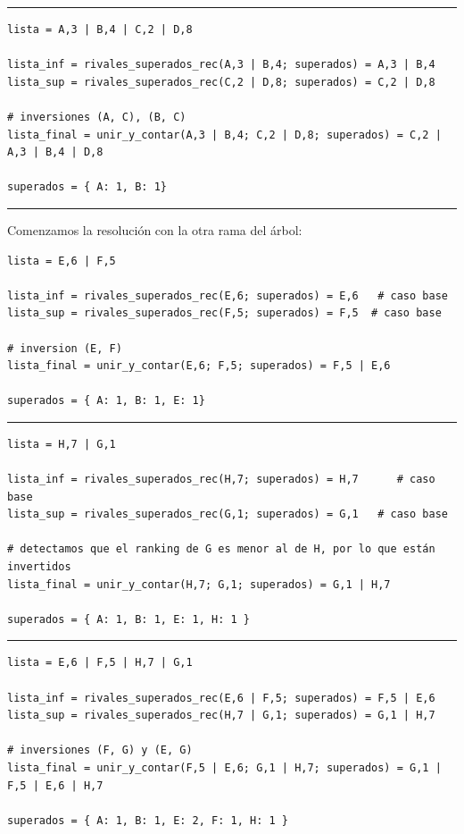 \documentclass[titlepage,a4paper]{article}
\begin{document}
\noindent\rule{\textwidth}{0.5pt}


\begin{verbatim}
lista = A,3 | B,4 | C,2 | D,8

lista_inf = rivales_superados_rec(A,3 | B,4; superados) = A,3 | B,4
lista_sup = rivales_superados_rec(C,2 | D,8; superados) = C,2 | D,8

# inversiones (A, C), (B, C)
lista_final = unir_y_contar(A,3 | B,4; C,2 | D,8; superados) = C,2 | A,3 | B,4 | D,8

superados = { A: 1, B: 1}
\end{verbatim}

\noindent\rule{\textwidth}{0.5pt}

Comenzamos la resolución con la otra rama del árbol:

\begin{verbatim}
lista = E,6 | F,5

lista_inf = rivales_superados_rec(E,6; superados) = E,6   # caso base
lista_sup = rivales_superados_rec(F,5; superados) = F,5  # caso base

# inversion (E, F)
lista_final = unir_y_contar(E,6; F,5; superados) = F,5 | E,6

superados = { A: 1, B: 1, E: 1}
\end{verbatim}

\noindent\rule{\textwidth}{0.5pt}
\begin{verbatim}
lista = H,7 | G,1

lista_inf = rivales_superados_rec(H,7; superados) = H,7      # caso base
lista_sup = rivales_superados_rec(G,1; superados) = G,1   # caso base

# detectamos que el ranking de G es menor al de H, por lo que están invertidos
lista_final = unir_y_contar(H,7; G,1; superados) = G,1 | H,7

superados = { A: 1, B: 1, E: 1, H: 1 }
\end{verbatim}

\noindent\rule{\textwidth}{0.5pt}

\begin{verbatim}
lista = E,6 | F,5 | H,7 | G,1

lista_inf = rivales_superados_rec(E,6 | F,5; superados) = F,5 | E,6
lista_sup = rivales_superados_rec(H,7 | G,1; superados) = G,1 | H,7

# inversiones (F, G) y (E, G)
lista_final = unir_y_contar(F,5 | E,6; G,1 | H,7; superados) = G,1 | F,5 | E,6 | H,7

superados = { A: 1, B: 1, E: 2, F: 1, H: 1 }
\end{verbatim}
\end{document}
